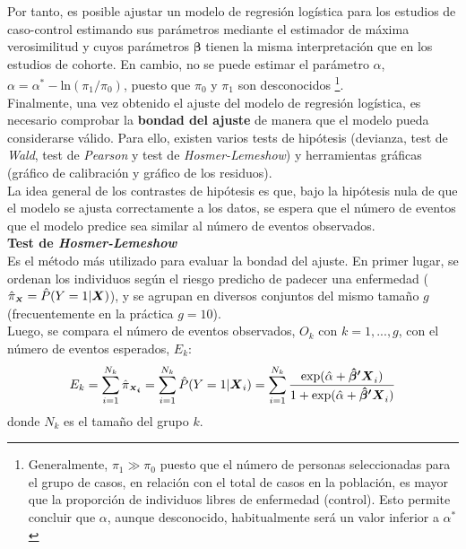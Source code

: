 Por tanto, es posible ajustar un modelo de regresión logística para los estudios de caso-control estimando sus parámetros mediante el estimador de máxima verosimilitud y cuyos parámetros $\boldsymbol{\beta}$ tienen la misma interpretación que en los estudios de cohorte. En cambio, no se puede estimar el parámetro $\alpha$, $\alpha=\alpha^{*}-\text{ln}(\pi_1/\pi_0)$, puesto que $\pi_0$ y $\pi_1$ son desconocidos \footnote{Generalmente, $\pi_1 \gg \pi_0$ puesto que el número de personas seleccionadas para el grupo de casos, en relación con el total de casos en la población, es mayor que la proporción de individuos libres de enfermedad (control). Esto permite concluir que $\alpha$, aunque desconocido, habitualmente será un valor inferior a $\alpha^{*}$}.\\
\newpage
Finalmente, una vez obtenido el ajuste del modelo de regresión logística, es necesario comprobar la \textbf{bondad del ajuste} de manera que el modelo pueda considerarse válido. Para ello, existen varios tests de hipótesis (devianza, test de \textit{Wald}, test de \textit{Pearson} y test de \textit{Hosmer-Lemeshow}) y herramientas gráficas (gráfico de calibración y gráfico de los residuos).\\

La idea general de los contrastes de hipótesis es que, bajo la hipótesis nula de que el modelo se ajusta correctamente a los datos, se espera que el número de eventos que el modelo predice sea similar al número de eventos observados.\\

\textbf{Test de \textit{Hosmer-Lemeshow}}\\
[0.3cm]
Es el método más utilizado para evaluar la bondad del ajuste. En primer lugar, se ordenan los individuos según el riesgo predicho de padecer una enfermedad ($\hat{\pi}_{\mathsmaller{\boldsymbol{X}}}=\hat{P}(Y=1|\boldsymbol{X})$), y se agrupan en diversos conjuntos del mismo tamaño $g$ (frecuentemente en la práctica $g=10$).\\

Luego, se compara el número de eventos observados, $O_k$ con $k=1,..., g$, con el número de eventos esperados, $E_k$:
\begin{equation*}
E_k=\sum_{i=1}^{N_k}\hat{\pi}_{\mathsmaller{\boldsymbol{X_i}}}=\sum_{i=1}^{N_k}\hat{P}(Y=1|\boldsymbol{X}_i)=\sum_{i=1}^{N_k}\frac{\exp(\hat{\alpha} + \boldsymbol{\hat{\beta}'X}_i)}{1+\exp(\hat{\alpha} + \boldsymbol{\hat{\beta}'X}_i)}
\end{equation*}
donde $N_k$ es el tamaño del grupo $k$.\\

